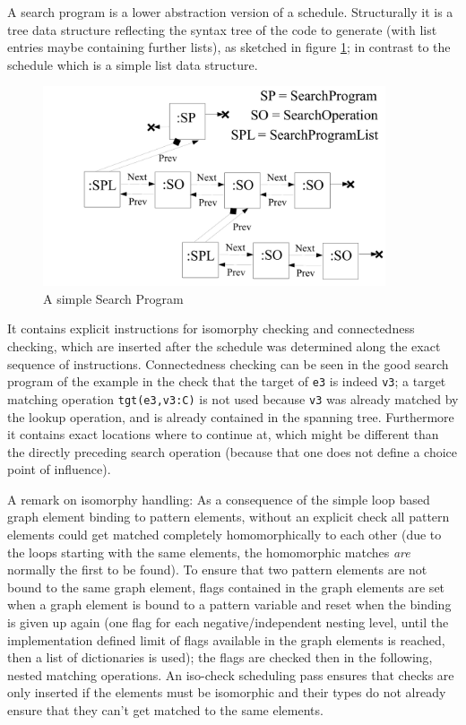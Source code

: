 A search program is a lower abstraction version of a schedule.
Structurally it is a tree data structure reflecting the syntax tree of the code to generate (with list entries maybe containing further lists), as sketched in figure \ref{figsearchprogram}; in contrast to the schedule which is a simple list data structure.

\begin{figure}[htbp]
  \centering
  \includegraphics[width=0.9\textwidth]{fig/SearchProgram}
  \caption{A simple Search Program}
  \label{figsearchprogram}
\end{figure}

It contains explicit instructions for isomorphy checking and connectedness checking, which are inserted after the schedule was determined along the exact sequence of instructions.
Connectedness checking can be seen in the good search program of the example in the check that the target of \texttt{e3} is indeed \texttt{v3};
a target matching operation \texttt{tgt(e3,v3:C)} is not used because \texttt{v3} was already matched by the lookup operation, and is already contained in the spanning tree.
Furthermore it contains exact locations where to continue at, which might be different than the directly preceding search operation (because that one does not define a choice point of influence).

A remark on isomorphy handling: As a consequence of the simple loop based graph element binding to pattern elements, without an explicit check all pattern elements could get matched completely homomorphically to each other (due to the loops starting with the same elements, the homomorphic matches \emph{are} normally the first to be found).
To ensure that two pattern elements are not bound to the same graph element, flags contained in the graph elements are set when a graph element is bound to a pattern variable and reset when the binding is given up again (one flag for each negative/independent nesting level, until the implementation defined limit of flags available in the graph elements is reached, then a list of dictionaries is used); the flags are checked then in the following, nested matching operations. An iso-check scheduling pass ensures that checks are only inserted if the elements must be isomorphic and their types do not already ensure that they can't get matched to the same elements.


